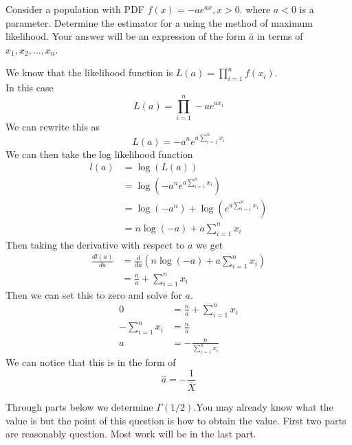 \documentclass[answers,12pt,addpoints]{exam}
\begin{document}
\begin{questions}
    \question Consider a population with PDF $f(x) = -ae^{ax}, x > 0$. where $a < 0$ is a parameter. Determine the estimator for a using the method of maximum likelihood. Your answer will be an expression of the form $\hat{a}$ in terms of $x_1 , x_2, \ldots, x_n$.
    \begin{solution}
        We know that the likelihood function is $L(a) = \prod_{i=1}^{n}f(x_i)$.\\
        In this case $$L(a) = \prod_{i=1}^{n}-ae^{ax_i}$$
        We can rewrite this as $$L(a) = -a^n e^{a\sum_{i=1}^{n}x_i}$$
        We can then take the log likelihood function
        \begin{align*}
            l(a) &= \log(L(a))\\
            &= \log(-a^n e^{a\sum_{i=1}^{n}x_i})\\
            &= \log(-a^n) + \log(e^{a\sum_{i=1}^{n}x_i})\\
            &= n\log(-a) + a\sum_{i=1}^{n}x_i
        \end{align*}
        Then taking the derivative with respect to $a$ we get
        \begin{align*}
            \frac{dl(a)}{da} &= \frac{d}{da}(n\log(-a) + a\sum_{i=1}^{n}x_i)\\
            &= \frac{n}{a} + \sum_{i=1}^{n}x_i
        \end{align*}
        Then we can set this to zero and solve for $a$.
        \begin{align*}
            0 &= \frac{n}{a} + \sum_{i=1}^{n}x_i\\
            -\sum_{i=1}^{n}x_i &= \frac{n}{a}\\
            a &= -\frac{n}{\sum_{i=1}^{n}x_i}
        \end{align*}
        We can notice that this is in the form of 
        $$ \hat{a} = -\frac{1}{\bar{X}}$$
    \end{solution} 

    \question Through parts below we determine $\Gamma(1/2)$.You may already know what the value is but the point of this question is how to obtain the value. First two parts are reasonably question. Most work will be in the last part.
\end{questions}
\end{document}
